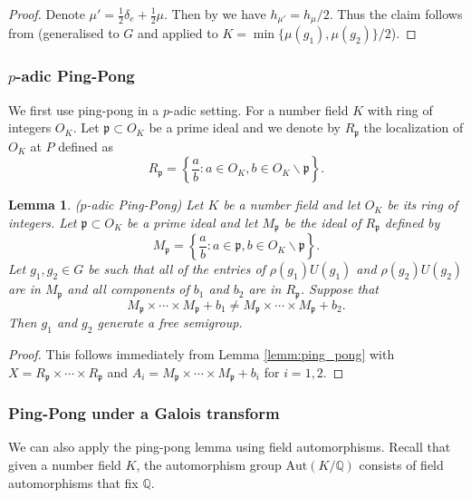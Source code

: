 \documentclass[10pt, english,oneside,reqno]{amsart}
\theoremstyle{plain}
\newtheorem{lemma}[theorem]{Lemma}
\theoremstyle{remark}
\numberwithin{equation}{section}
\numberwithin{figure}{section}
\newcommand{\Q}{\mathbb{Q}}
\begin{document}
\begin{proof}
    Denote $\mu' = \frac{1}{2}\delta_e + \frac{1}{2}\mu$. Then by \cite[Lemma 6.8]{HochmanSolomyak2017} we have $h_{\mu'} = h_{\mu}/2$. Thus the claim follows from \cite[Proposition 9.7]{Kittle2023} (generalised to $G$ and applied to $K = \min\{ \mu(g_1), \mu(g_2) \}/2$).
\end{proof}


\subsubsection{$p$-adic Ping-Pong}

We first use ping-pong in a $p$-adic setting. For a number field $K$ with ring of integers $O_K$. Let $\mathfrak{p} \subset O_K$ be a prime ideal and we denote by $R_{\mathfrak{p}}$ the localization of $O_K$ at $P$ defined as $$R_{\mathfrak{p}} = \left\{ \frac{a}{b} : a \in O_K, b \in O_K \backslash \mathfrak{p} \right\}.$$

\begin{lemma}($p$-adic Ping-Pong) \label{lemm:p_adic_ping_pong}
	Let $K$ be a number field and let $O_K$ be its ring of integers. Let $\mathfrak{p} \subset O_K$ be a prime ideal and let $M_{\mathfrak{p}}$ be the ideal of $R_{\mathfrak{p}}$ defined by $$M_{\mathfrak{p}} = \left\{ \frac{a}{b} : a \in \mathfrak{p}, b \in O_K \backslash \mathfrak{p} \right\}.$$ Let $g_1, g_2 \in G$ be such that all of the entries of $\rho(g_1) U(g_1)$ and $\rho(g_2) U(g_2)$ are in $M_{\mathfrak{p}}$ and all components of $b_1$ and $b_2$ are in $R_{\mathfrak{p}}$. Suppose that $$M_{\mathfrak{p}} \times \cdots \times M_{\mathfrak{p}} + b_1 \neq M_{\mathfrak{p}} \times \cdots \times M_{\mathfrak{p}} + b_2.$$ Then $g_1$ and $g_2$ generate a free semigroup.
\end{lemma}

\begin{proof}
	This follows immediately from Lemma \ref{lemm:ping_pong} with $X = R_{\mathfrak{p}} \times \cdots \times R_{\mathfrak{p}}$ and $A_i = M_{\mathfrak{p}} \times \cdots \times M_{\mathfrak{p}} + b_i$ for $i=1, 2$.
\end{proof}


\subsubsection{Ping-Pong under a Galois transform}

We can also apply the ping-pong lemma using field automorphisms. Recall that given a number field $K$, the automorphism group $\mathrm{Aut}(K/\Q)$ consists of field automorphisms that fix $\Q$.
\end{document}
